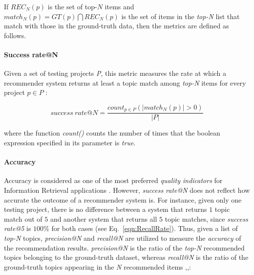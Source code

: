 If $REC_{N}(p)$ is the set of top-$N$ items and\\
 $match_{N}(p)=  GT(p) \bigcap REC_{N}(p) $ is the set of items in the \emph{top-N} list that match with those in the ground-truth data, then the metrics are defined as follows.

\paragraph{\textbf{Success rate@N}} Given a set of testing projects \emph{P}, this metric measures the rate at which a recommender system returns at least a topic match among \emph{top-N} items for every project $p \in P$ \cite{6671293}: %
\vspace{-.3cm}

\begin{equation} \label{eqn:RecallRate}
success\ rate@N=\frac{ count_{p \in P}( \left |  match_{N}(p) \right | > 0 ) }{\left | P \right |} %
\end{equation}

\noindent where the function \emph{count()} counts the number of times that the boolean expression specified in its parameter is \emph{true}.


\paragraph{\textbf{Accuracy}} Accuracy is considered as one of the most preferred \emph{quality indicators} for Information Retrieval applications \cite{Saracevic:1995:EEI:215206.215351}. However, \emph{success rate@N} does not reflect how accurate the outcome of a recommender system is. For instance, given only one testing project, there is no difference between a system that returns $1$ topic match out of $5$ and another system that returns all $5$ topic matches, since \emph{success rate@5} is $100\%$ for both cases (see Eq.~\eqref{eqn:RecallRate}). Thus, given a list of \emph{top-N} topics, \emph{precision@N} and \emph{recall@N} are utilized to measure the \emph{accuracy} of the recommendation results. \emph{precision@N} is the ratio of the \emph{top-N} recommended topics belonging to the ground-truth dataset, whereas \emph{recall@N} is the ratio of the ground-truth topics appearing in the \emph{N} recommended items \cite{Nguyen:2019:FRS:3339505.3339636},\cite{DiNoia:2012:LOD:2362499.2362501},\cite{Davis:2006:RPR:1143844.1143874}: %

